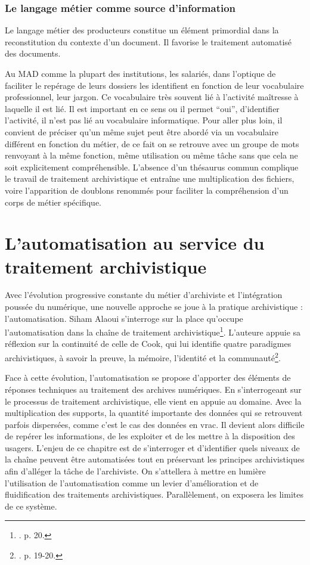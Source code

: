 \subsection*{Le langage métier comme source d’information}

Le langage métier des producteurs constitue un élément primordial dans la reconstitution du contexte d'un document. Il favorise le traitement automatisé des documents. 

Au MAD comme la plupart des institutions, les salariés, dans l'optique de faciliter le repérage de leurs dossiers les identifient en fonction de leur vocabulaire professionnel, leur jargon. Ce vocabulaire très souvent lié à l'activité maîtresse à laquelle il est lié. Il est important en ce sens ou il permet \enquote{oui}, d'identifier l'activité, il n'est pas lié au vocabulaire informatique. 
Pour aller plus loin, il convient de préciser qu'un même sujet peut être abordé via un vocabulaire différent en fonction du métier, de ce fait on se retrouve avec un groupe de mots renvoyant à la même fonction, même utilisation ou même tâche sans que cela ne soit explicitement compréhensible. L'absence d'un thésaurus commun complique le travail de traitement archivistique et entraîne une multiplication des fichiers, voire l'apparition de doublons renommés pour faciliter la compréhension d'un corps de métier spécifique.


\chapter{L’automatisation au service du traitement archivistique}

Avec l'évolution progressive constante du métier d'archiviste et l’intégration poussée du numérique, une nouvelle approche se joue à la pratique archivistique : l'automatisation. Siham Alaoui s'interroge sur la place qu'occupe l'automatisation dans la chaîne de traitement archivistique\footnote{\cite{alaoui2024automatisation}. p. 20.}. L'auteure appuie sa réflexion sur la continuité de celle de Cook, qui lui identifie quatre paradigmes archivistiques, à savoir la preuve, la mémoire, l'identité et la communauté\footnote{\cite{alaoui2024automatisation}. p. 19-20.}. 

Face à cette évolution, l’automatisation se propose d'apporter des éléments de réponses techniques au traitement des archives numériques. En s’interrogeant sur le processus de traitement archivistique, elle vient en appuie au domaine. Avec la multiplication des supports, la quantité importante des données qui se retrouvent parfois dispersées, comme c'est le cas des données en vrac. Il devient alors difficile de repérer les informations, de les exploiter et de les mettre à la disposition des usagers. L'enjeu de ce chapitre est de s'interroger et d'identifier quels niveaux de la chaîne peuvent être automatisées tout en préservant les principes archivistiques afin d’alléger la tâche de l'archiviste.  On s’attellera à mettre en lumière l'utilisation de l'automatisation comme un levier d'amélioration et de fluidification des  traitements archivistiques. Parallèlement, on exposera les limites de ce système.

